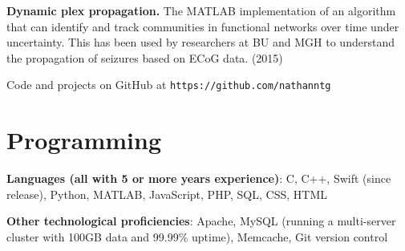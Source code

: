 \bigskip

\noindent
	\textbf{Dynamic plex propagation.} The MATLAB implementation of an algorithm that can identify and track communities in functional networks over time under uncertainty. This has been used by researchers at BU and MGH to understand the propagation of seizures based on ECoG data. (2015)

\bigskip

\noindent
	Code and projects on GitHub at \texttt{https://github.com/nathanntg}
	

\section*{Programming} 

	\textbf{Languages (all with 5 or more years experience)}: C, C++, Swift (since release), Python, MATLAB, JavaScript, PHP, SQL, CSS, HTML

\bigskip

\noindent
	\textbf{Other technological proficiencies}: Apache, MySQL (running a multi-server cluster with 100GB data and 99.99\% uptime), Memcache, Git version control
